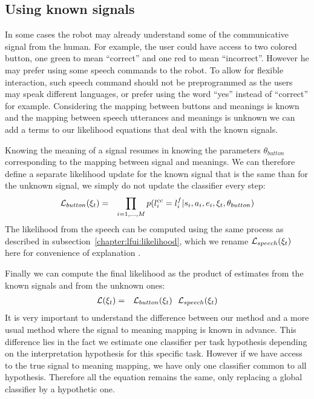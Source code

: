 
\subsection{Using known signals}

In some cases the robot may already understand some of the communicative signal from the human. For example, the user could have access to two colored button, one green to mean ``correct'' and one red to mean ``incorrect''. However he may prefer using some speech commands to the robot. To allow for flexible interaction, such speech command should not be preprogrammed as the users may speak different languages, or prefer using the word ``yes'' instead of ``correct'' for example. Considering the mapping between buttons and meanings is known and the mapping between speech utterances and meanings is unknown we can add a terms to our likelihood equations that deal with the known signals. 

Knowing the meaning of a signal resumes in knowing the parameters $\theta_{button}$ corresponding to the mapping between signal and meanings. We can therefore define a separate likelihood update for the known signal that is the same than for the unknown signal, we simply do not update the classifier every step:
%
\begin{eqnarray}
\mathcal{L}_{button}(\xi_t) &=& \prod_{i = 1,\ldots, M} p(l^{cc}_i = l^f_i | s_i, a_i, e_i, \xi_t, \theta_{button})
\end{eqnarray}
%
The likelihood from the speech can be computed using the same process as described in subsection~\ref{chapter:lfui:likelihood}, which we rename $\mathcal{L}_{speech}(\xi_t)$ here for convenience of explanation .

Finally we can compute the final likelihood as the product of estimates from the known signals and from the unknown ones:
%
\begin{eqnarray}
\mathcal{L}(\xi_t) &=& \mathcal{L}_{button}(\xi_t) ~~ \mathcal{L}_{speech}(\xi_t)
\end{eqnarray}
%
It is very important to understand the difference between our method and a more usual method where the signal to meaning mapping is known in advance. This difference lies in the fact we estimate one classifier per task hypothesis depending on the interpretation hypothesis for this specific task. However if we have access to the true signal to meaning mapping, we have only one classifier common to all hypothesis. Therefore all the equation remains the same, only replacing a global classifier by a hypothetic one.

